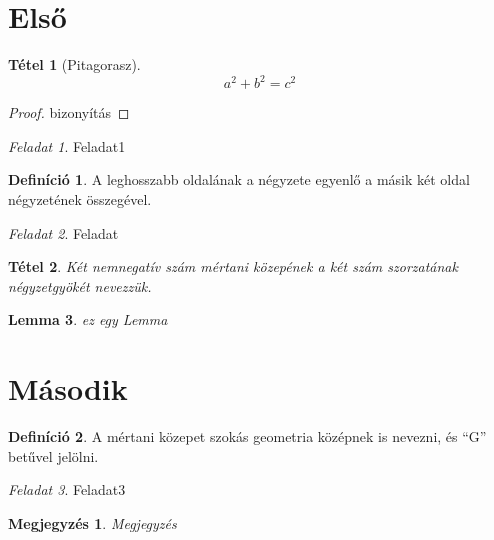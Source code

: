 \documentclass{article}
\newtheorem*{megj}{Megjegyzés}
\theoremstyle{plain}
\newtheorem{tet}{Tétel}
\newtheorem{lemma}[tet]{Lemma}
\theoremstyle{definition}
\newtheorem{defin}{Definíció}
\theoremstyle{remark}
\newtheorem{fel}{Feladat}[section]
\begin{document}
\section{Első}
\begin{tet}[Pitagorasz]
\[a^{2} +b^{2} = c^{2}\]
\end{tet}

\begin{proof}
bizonyítás
\end{proof}

\begin{fel}
Feladat1
\end{fel}

\begin{defin}
A leghosszabb oldalának a négyzete egyenlő a másik két oldal négyzetének összegével.
\end{defin}

\begin{fel}
Feladat
\end{fel}

\begin{tet}
Két nemnegatív szám mértani közepének a két szám szorzatának négyzetgyökét nevezzük.
\end{tet}
\begin{lemma}
ez egy Lemma
\end{lemma}
\section{Második}
\begin{defin}
A mértani közepet szokás geometria középnek is nevezni, és “G” betűvel jelölni.
\end{defin}

\begin{fel}
Feladat3
\end{fel}

\begin{megj}
Megjegyzés
\end{megj}
\end{document}

